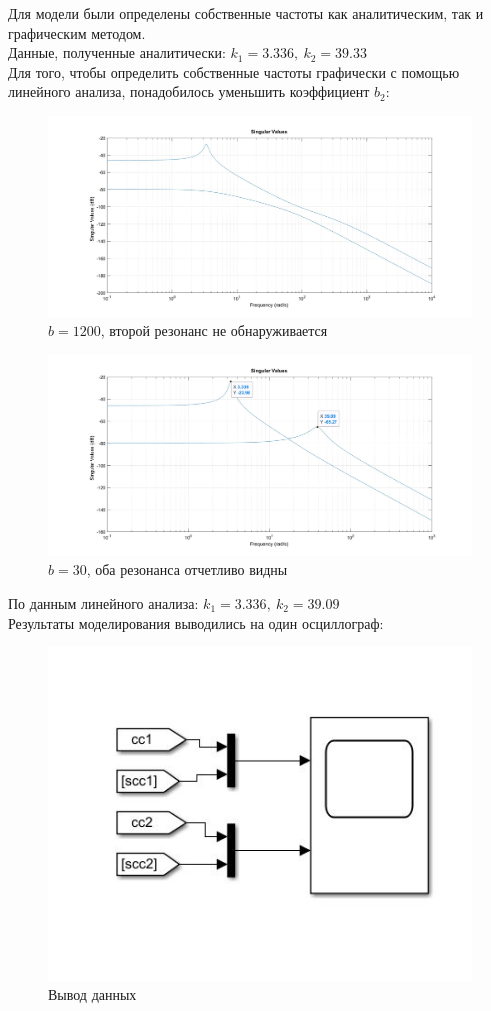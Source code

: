 \documentclass{article}
\begin{document}
	Для модели были определены собственные частоты как аналитическим, так и графическим методом.\\
	Данные, полученные аналитически: $k_1 = 3.336,\ k_2 = 39.33$\\
	Для того, чтобы определить собственные частоты графически с помощью линейного анализа, понадобилось уменьшить коэффициент $b_2$:
	\begin{figure}[H]
		\centering
		\includegraphics[width=1\linewidth]{sv_b1200}
		\caption{$b = 1200$, второй резонанс не обнаруживается}
		\label{fig:svb1200}
	\end{figure}
	\begin{figure}[H]
		\centering
		\includegraphics[width=1\linewidth]{sv_b30}
		\caption{$b=30$, оба резонанса отчетливо видны}
		\label{fig:svb30}
	\end{figure}
	По данным линейного анализа: $k_1 = 3.336,\ k_2 = 39.09$\\
	Результаты моделирования выводились на один осциллограф:
	\begin{figure}[H]
		\centering
		\includegraphics[width=0.7\linewidth]{out}
		\caption{Вывод данных}
		\label{fig:out}
	\end{figure}
	
\end{document}
